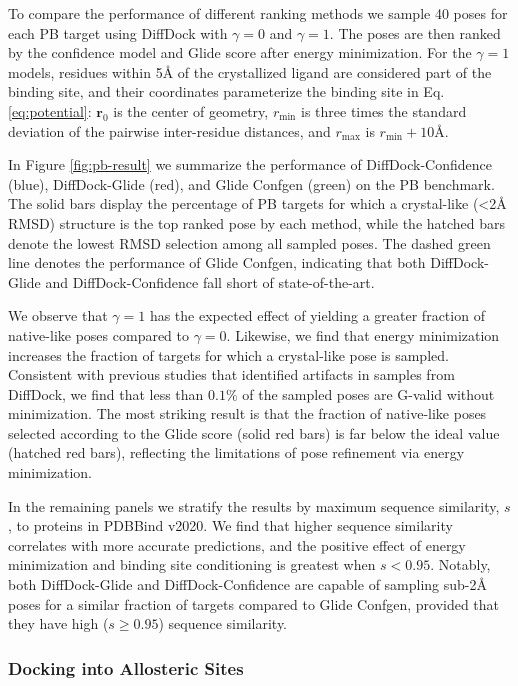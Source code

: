 \documentclass[%
 aip,
 amsmath,amssymb,
reprint,%
]{revtex4-1}
\begin{document}
To compare the performance of different ranking methods we sample 40 poses for each PB target using DiffDock with $\gamma=0$ and $\gamma=1$. The poses are then ranked by the confidence model and Glide score after energy minimization. For the $\gamma=1$ models, residues within 5{\AA} of the crystallized ligand are considered part of the binding site, and their coordinates parameterize the binding site in Eq. \ref{eq:potential}: $\mathbf{r}_0$ is the center of geometry, $r_\mathrm{min}$ is three times the standard deviation of the pairwise inter-residue distances, and $r_\mathrm{max}$ is $r_\mathrm{min} + 10${\AA}.

In Figure \ref{fig:pb-result} we summarize the performance of DiffDock-Confidence (blue), DiffDock-Glide (red), and Glide Confgen (green) on the PB benchmark. The solid bars display the percentage of PB targets for which a crystal-like (<2{\AA} RMSD) structure is the top ranked pose by each method, while the hatched bars denote the lowest RMSD selection among all sampled poses. The dashed green line denotes the performance of Glide Confgen, indicating that both DiffDock-Glide and DiffDock-Confidence fall short of state-of-the-art.

We observe that $\gamma=1$ has the expected effect of yielding a greater fraction of native-like poses compared to $\gamma=0$. Likewise, we find that energy minimization increases the fraction of targets for which a crystal-like pose is sampled. Consistent with previous studies that identified artifacts in samples from DiffDock, we find that less than $0.1\%$ of the sampled poses are G-valid without minimization.\cite{buttenschoen2024posebusters,errington2024plif} The most striking result is that the fraction of native-like poses selected according to the Glide score (solid red bars) is far below the ideal value (hatched red bars), reflecting the limitations of pose refinement via energy minimization.

In the remaining panels we stratify the results by maximum sequence similarity, $s$, to proteins in PDBBind v2020. We find that higher sequence similarity correlates with more accurate predictions, and the positive effect of energy minimization and binding site conditioning is greatest when $s<0.95$. Notably, both DiffDock-Glide and DiffDock-Confidence are capable of sampling sub-2{\AA} poses for a similar fraction of targets compared to Glide Confgen, provided that they have high ($s \geq 0.95$) sequence similarity.


\subsubsection{Docking into Allosteric Sites}
\end{document}
